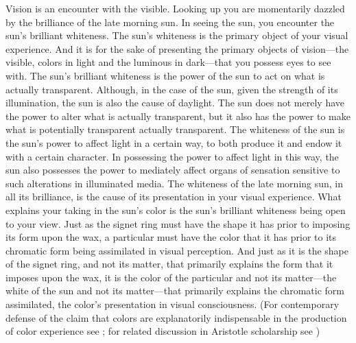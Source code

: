 Vision is an encounter with the visible. Looking up you are momentarily dazzled by the brilliance of the late morning sun. In seeing the sun, you encounter the sun's brilliant whiteness. The sun's whiteness is the primary object of your visual experience. And it is for the sake of presenting the primary objects of vision---the visible, colors in light and the luminous in dark---that you possess eyes to see with. The sun's brilliant whiteness is the power of the sun to act on what is actually transparent. Although, in the case of the sun, given the strength of its illumination, the sun is also the cause of daylight. The sun does not merely have the power to alter what is actually transparent, but it also has the power to make what is potentially transparent actually transparent. The whiteness of the sun is the sun's power to affect light in a certain way, to both produce it and endow it with a certain character. In possessing the power to affect light in this way, the sun also possesses the power to mediately affect organs of sensation sensitive to such alterations in illuminated media. The whiteness of the late morning sun, in all its brilliance, is the cause of its presentation in your visual experience. What explains your taking in the sun's color is the sun's brilliant whiteness being open to your view. Just as the signet ring must have the shape it has prior to imposing its form upon the wax, a particular must have the color that it has prior to its chromatic form being assimilated in visual perception. And just as it is the shape of the signet ring, and not its matter, that primarily explains the form that it imposes upon the wax, it is the color of the particular and not its matter---the white of the sun and not its matter---that primarily explains the chromatic form assimilated, the color's presentation in visual consciousness. (For contemporary defense of the claim that colors are explanatorily indispensable in the production of color experience see \citealt{Campbell:1997dq,Broackes:1997pa,Yablo:1995fk}; for related discussion in Aristotle scholarship see \citealt{Broadie:1993fk,Broackes:1999uq})

